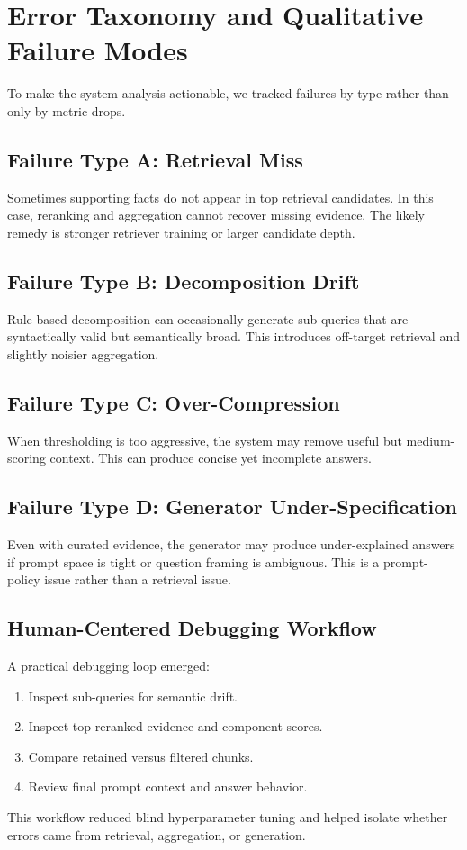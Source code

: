 \documentclass[10pt,draftclsnofoot,onecolumn,journal]{IEEEtran}
\begin{document}
\section{Error Taxonomy and Qualitative Failure Modes}
To make the system analysis actionable, we tracked failures by type rather than only by metric drops.

\subsection{Failure Type A: Retrieval Miss}
Sometimes supporting facts do not appear in top retrieval candidates. In this case, reranking and aggregation cannot recover missing evidence. The likely remedy is stronger retriever training or larger candidate depth.

\subsection{Failure Type B: Decomposition Drift}
Rule-based decomposition can occasionally generate sub-queries that are syntactically valid but semantically broad. This introduces off-target retrieval and slightly noisier aggregation.

\subsection{Failure Type C: Over-Compression}
When thresholding is too aggressive, the system may remove useful but medium-scoring context. This can produce concise yet incomplete answers.

\subsection{Failure Type D: Generator Under-Specification}
Even with curated evidence, the generator may produce under-explained answers if prompt space is tight or question framing is ambiguous. This is a prompt-policy issue rather than a retrieval issue.

\subsection{Human-Centered Debugging Workflow}
A practical debugging loop emerged:
\begin{enumerate}
\item Inspect sub-queries for semantic drift.
\item Inspect top reranked evidence and component scores.
\item Compare retained versus filtered chunks.
\item Review final prompt context and answer behavior.
\end{enumerate}
This workflow reduced blind hyperparameter tuning and helped isolate whether errors came from retrieval, aggregation, or generation.
\end{document}
